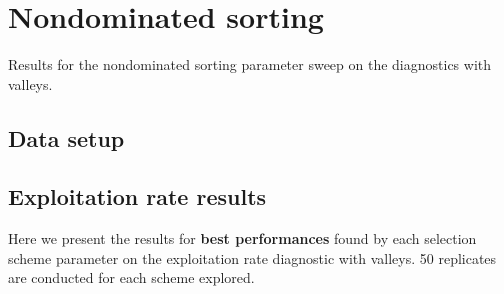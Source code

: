 \documentclass[]{book}
\newenvironment{Shaded}{\begin{snugshade}}{\end{snugshade}}
\newcommand{\DataTypeTok}[1]{\textcolor[rgb]{0.13,0.29,0.53}{#1}}
\newcommand{\KeywordTok}[1]{\textcolor[rgb]{0.13,0.29,0.53}{\textbf{#1}}}
\newcommand{\NormalTok}[1]{#1}
\newcommand{\OperatorTok}[1]{\textcolor[rgb]{0.81,0.36,0.00}{\textbf{#1}}}
\newcommand{\OtherTok}[1]{\textcolor[rgb]{0.56,0.35,0.01}{#1}}
\newcommand{\StringTok}[1]{\textcolor[rgb]{0.31,0.60,0.02}{#1}}
\begin{document}
\hypertarget{nondominated-sorting}{%
\chapter{Nondominated sorting}\label{nondominated-sorting}}

Results for the nondominated sorting parameter sweep on the diagnostics with valleys.

\hypertarget{data-setup-4}{%
\section{Data setup}\label{data-setup-4}}

\begin{Shaded}
\end{Shaded}

\hypertarget{exploitation-rate-results-4}{%
\section{Exploitation rate results}\label{exploitation-rate-results-4}}

Here we present the results for \textbf{best performances} found by each selection scheme parameter on the exploitation rate diagnostic with valleys.
50 replicates are conducted for each scheme explored.
\end{document}

